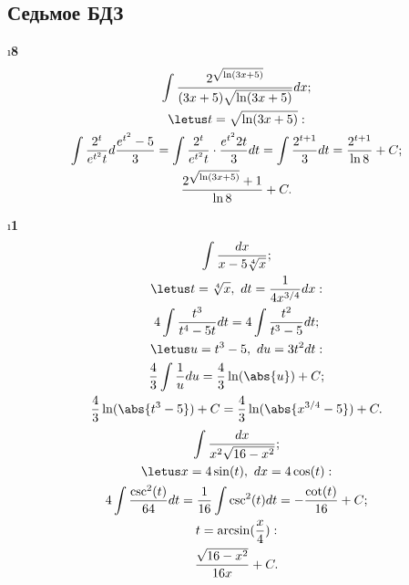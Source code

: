 \subsection{Седьмое БДЗ}

\setcounter{iii}{5}

\i \textbf{8}
\begin{gather*}
    \int \frac{2^{\sqrt{\ln(3x+5)}}}{(3x+5)\sqrt{\ln(3x+5)}}dx;\\
    \letus t = \sqrt{\ln(3x+5)}:\\
    \int \frac{2^t}{e^{t^2}t}d\frac{e^{t^2}-5}{3} = 
    \int \frac{2^t}{e^{t^2}t}\cdot \frac{e^{t^2}2t}{3} dt =
    \int \frac{2^{t+1}}{3} dt = 
    \frac{2^{t+1}}{\ln 8} + C;\\
    \frac{2^{\sqrt{\ln(3x+5)}}+1}{\ln 8} + C.
\end{gather*}

\i \textbf{1}\\
\pu 
\begin{gather*}
    \int \frac{dx}{x-5\sqrt[4]{x}};\\
    \letus t = \sqrt[4]{x},\ dt = \frac{1}{4x^{3/4}}dx:\\
    4 \int \frac{t^3}{t^4 - 5t}dt = 4\int \frac{t^2}{t^3 - 5}dt;\\
    \letus u = t^3-5,\ du = 3t^2 dt:\\
    \frac{4}{3} \int \frac{1}{u} du = \frac{4}{3} \ln(\abs{u}) + C;\\
    \frac{4}{3} \ln(\abs{t^3-5}) + C = \frac{4}{3} \ln(\abs{x^{3/4}-5}) + C.
\end{gather*}
\pu 
\begin{gather*}
    \int \frac{dx}{x^2\sqrt{16-x^2}};\\
    \letus x = 4\sin(t),\ dx = 4\cos(t):\\
    4 \int \frac{\csc^2(t)}{64}dt = \frac{1}{16} \int \csc^2(t) dt = -\frac{\cot(t)}{16} + C;\\
    t = \arcsin(\frac{x}{4}):\\
    \frac{\sqrt{16-x^2}}{16x} + C.
\end{gather*}


